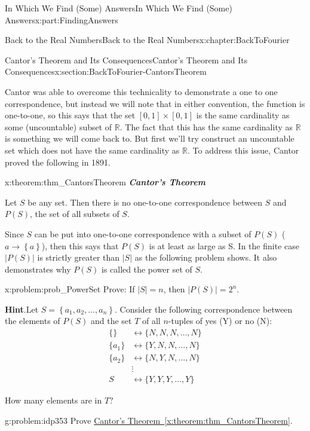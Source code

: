 \documentclass[oneside,10pt,]{book}
\newcommand{\blocktitlefont}{\relax}
\newcommand{\xreffont}{\relax}
\newcommand{\alert}[1]{\textbf{\textit{#1}}}
\numberwithin{equation}{section}
\newcommand{\abs}[1]{\left|#1\right|}
\newcommand{\RR}{\mathbb {R}}
\newcommand{\amp}{&}
\begin{document}
\begin{partptx}{In Which We Find (Some) Answers}{}{In Which We Find (Some) Answers}{}{}{x:part:FindingAnswers}
\begin{chapterptx}{Back to the Real Numbers}{}{Back to the Real Numbers}{}{}{x:chapter:BackToFourier}
\begin{sectionptx}{Cantor's Theorem and Its Consequences}{}{Cantor's Theorem and Its Consequences}{}{}{x:section:BackToFourier-CantorsTheorem}
\par
Cantor was able to overcome this technicality to demonstrate a one to one correspondence, but instead we will note that in either convention, the function is one-to-one, so this says that the set \([0,1]\times[0,1]\) is the same cardinality as some (uncountable) subset of \(\RR\).  The fact that this has the same cardinality as \(\RR\) is something we will come back to. But first we'll try construct an uncountable set which does not have the same cardinality as \(\RR\).  To address this issue, Cantor proved the following in 1891.%
\begin{theorem}{}{}{x:theorem:thm_CantorsTheorem}%
\alert{Cantor's Theorem}%
\par
{} Let \(S\) be any set.  Then there is no one-to-one correspondence between \(S\) and \(P(S)\), the set of all subsets of \(S\).%
\end{theorem}
Since \(S\) can be put into one-to-one correspondence with a subset of \(P(S)\) (\(a\rightarrow \left\{a\right\}\)), then this says that \(P(S)\) is at least as large as S. In the finite case \(\abs{P(S)}\) is strictly greater than \(\abs{S}\) as the following problem shows. It also demonstrates why \(P(S)\) is called the power set of \(S\).%
\begin{problem}{}{x:problem:prob_PowerSet}%
Prove: If \(\abs{S}=n\), then \(\abs{ P(S)}=2^n\).%
\par\smallskip%
\noindent\textbf{\blocktitlefont Hint}.\hypertarget{g:hint:idp352}{}\quad{}Let \(S=\left\{a_1,a_2,\ldots,a_n\right\}\). Consider the following correspondence between the elements of \(P(S)\) and the set \(T\) of all \(n\)-tuples of yes (Y) or no (N):%
\begin{align*}
\{ \}  \amp \leftrightarrow \{N,N,N,\ldots,N\}\\
\{a_1\}\amp \leftrightarrow \{Y,N,N,\ldots ,N\}\\
\{a_2\}\amp \leftrightarrow \{N,Y,N,\ldots,N\}\\
\amp \vdots\\
S\amp \leftrightarrow \{Y,Y,Y,\ldots,Y\}
\end{align*}
%
\par
How many elements are in \(T?\)%
\end{problem}
\begin{problem}{}{g:problem:idp353}%
Prove \hyperref[x:theorem:thm_CantorsTheorem]{Cantor's Theorem~{\xreffont\ref{x:theorem:thm_CantorsTheorem}}}.%
\par\smallskip%

\end{problem}
\end{sectionptx}
\end{chapterptx}
\end{partptx}
\end{document}
